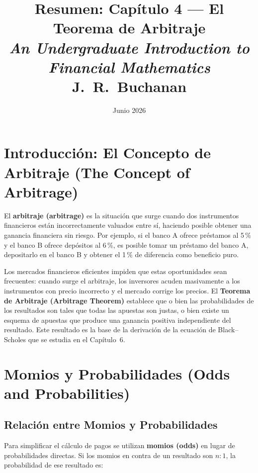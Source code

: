 \documentclass[12pt]{article}
\title{\textbf{Resumen: Cap\'itulo 4 --- El Teorema de Arbitraje}\\[4pt]
\large \textit{An Undergraduate Introduction to Financial Mathematics}\\
\normalsize J.~R.~Buchanan}
\author{}
\date{Junio 2026}
\begin{document}
\maketitle
\tableofcontents
\newpage

\section{Introducci\'on: El Concepto de Arbitraje (The Concept of Arbitrage)}

El \textbf{arbitraje (arbitrage)} es la situaci\'on que surge cuando dos
instrumentos financieros est\'an incorrectamente valuados entre s\'i, haciendo
posible obtener una ganancia financiera sin riesgo. Por ejemplo, si el banco A
ofrece pr\'estamos al 5\,\% y el banco B ofrece dep\'ositos al 6\,\%, es posible
tomar un pr\'estamo del banco A, depositarlo en el banco B y obtener el 1\,\%
de diferencia como beneficio puro.

Los mercados financieros eficientes impiden que estas oportunidades sean
frecuentes: cuando surge el arbitraje, los inversores acuden masivamente a
los instrumentos con precio incorrecto y el mercado corrige los precios.
El \textbf{Teorema de Arbitraje (Arbitrage Theorem)} establece que o bien
las probabilidades de los resultados son tales que todas las apuestas son
justas, o bien existe un esquema de apuestas que produce una ganancia positiva
independiente del resultado. Este resultado es la base de la derivaci\'on de
la ecuaci\'on de Black--Scholes que se estudia en el Cap\'itulo~6.

\section{Momios y Probabilidades (Odds and Probabilities)}

\subsection{Relaci\'on entre Momios y Probabilidades}

Para simplificar el c\'alculo de pagos se utilizan \textbf{momios (odds)}
en lugar de probabilidades directas. Si los momios en contra de un resultado
son $n:1$, la probabilidad de ese resultado es:
\end{document}

